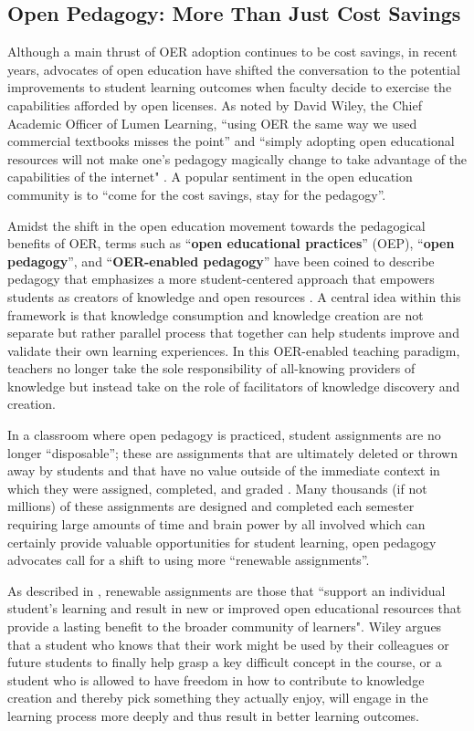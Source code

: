\documentclass[11pt]{article}
\begin{document}
\subsection{Open Pedagogy: More Than Just Cost Savings}
Although a main thrust of OER adoption continues to be cost savings, in recent years, advocates of open education have shifted the conversation to the potential improvements to student learning outcomes when faculty decide to exercise the capabilities afforded by open licenses.  As noted by David Wiley, the Chief Academic Officer of Lumen Learning, ``using OER the same way we used commercial textbooks misses the point'' and ``simply adopting open educational resources will not make one's pedagogy magically change to take advantage of the capabilities of the internet" \cite{DW:13}.  A popular sentiment in the open education community is to ``come for the cost savings, stay for the pedagogy''.

Amidst the shift in the open education movement towards the pedagogical benefits of OER, terms such as ``\textbf{open educational practices}'' (OEP), ``\textbf{open pedagogy}'', and ``\textbf{OER-enabled pedagogy}'' have been coined to describe pedagogy that emphasizes a more student-centered approach that empowers students as creators of knowledge and open resources \cite{EM:17, DW:13, DW-JH:18}.  A central idea within this framework is that knowledge consumption and knowledge creation are not separate but rather parallel process that together can help students improve and validate their own learning experiences.  In this OER-enabled teaching paradigm, teachers no longer take the sole responsibility of all-knowing providers of knowledge but instead take on the role of facilitators of knowledge discovery and creation.

In a classroom where open pedagogy is practiced, student assignments are no longer ``disposable''; these are assignments that are ultimately deleted or thrown away by students and that have no value outside of the immediate context in which they were assigned, completed, and graded \cite{DW:13, DW-JH:18}. Many thousands (if not millions) of these assignments are designed and completed each semester requiring large amounts of time and brain power by all involved which can certainly provide valuable opportunities for student learning, open pedagogy advocates call for a shift to using more ``renewable assignments''.

As described in \cite{DW:13, DW-JH:18}, renewable assignments are those that ``support an individual student's learning and result in new or improved open educational resources that provide a lasting benefit to the broader community of learners".  Wiley \cite{DW:13, DW-JH:18} argues that a student who knows that their work might be used by their colleagues or future students to finally help grasp a key difficult concept in the course, or a student who is allowed to have freedom in how to contribute to knowledge creation and thereby pick something they actually enjoy, will engage in the learning process more deeply and thus result in better learning outcomes.
\end{document}
